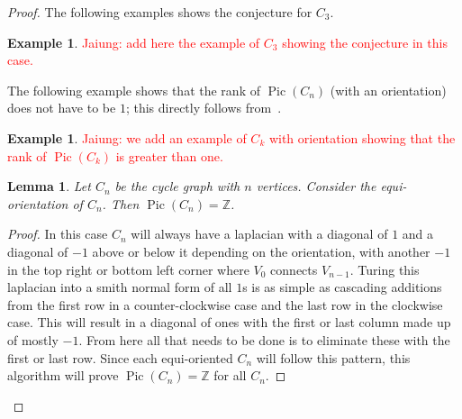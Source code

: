 \documentclass[11pt,reqno]{amsart}
\DeclareMathOperator{\Pic}{Pic}
\theoremstyle{definition}
\newtheorem{myeg}[mydef]{\textbf{Example}}
\theoremstyle{plain}
\newtheorem{lem}[mydef]{\textbf{Lemma}}
\begin{document}
\begin{proof}
		The following examples shows the conjecture for $C_3$.

		\begin{myeg}
			\textcolor{red}{Jaiung: add here the example of $C_3$ showing the conjecture in this case.}
		\end{myeg}

		The following example shows that the rank of $\Pic(C_n)$ (with an orientation) does not have to be $1$;
		this directly follows from~\cite[Corollary 3.5]{wagner2000critical}.

		\begin{myeg}
			\textcolor{red}{Jaiung: we add an example of $C_k$ with orientation showing that the rank of
			$\Pic(C_k)$ is greater than one. }
		\end{myeg}

		\begin{lem}
			Let $C_n$ be the cycle graph with $n$ vertices. Consider the equi-orientation of $C_n$.
			Then $\Pic(C_n)=\mathbb{Z}$.
		\end{lem}
		\begin{proof}
			In this case $C_n$ will always have a laplacian with a diagonal of $1$ and a diagonal of $-1$
			above or below it depending on the orientation, with another $-1$ in the top right or bottom left corner
			where $V_0$ connects $V_{n-1}$.  Turing this laplacian into a smith normal form of all $1$s is as simple as
			cascading additions from the first row in a counter-clockwise case and the last row in the clockwise case.
			This will result in a diagonal of ones with the first or last column made up of mostly $-1$.  From here
			all that needs to be done is to eliminate these with the first or last row.  Since each equi-oriented $C_n$
			will follow this pattern, this algorithm will prove $\Pic(C_n)=\mathbb{Z}$ for all $C_n$.
		\end{proof}


\end{proof}
\end{document}
